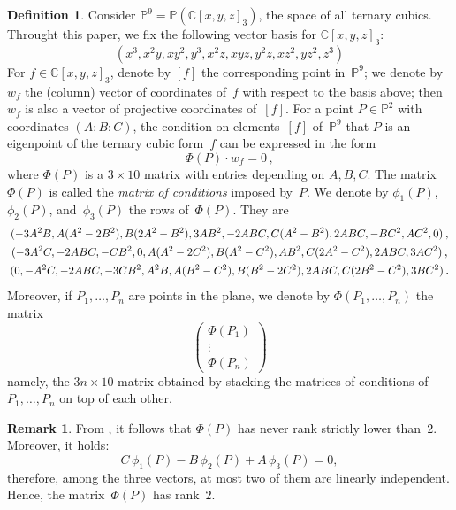 \documentclass[12pt, a4paper, reqno, captions=tableheading,bibliography=totoc]{scrartcl}
\theoremstyle{plain}
\theoremstyle{definition}
\newtheorem{definition}[lemma]{Definition}
\newtheorem{rmk}[lemma]{Remark}
\newcommand{\C}{\mathbb{C}}
\newcommand{\p}{\mathbb{P}}
\newcommand\scalemath[2]{\scalebox{#1}{\mbox{\ensuremath{\displaystyle #2}}}}
\begin{document}
\begin{definition}
\label{definition:matrix_conditions}
 Consider $\p^9 = \p(\C[x,y,z]_3)$, the space of all ternary cubics.
 Throught this paper, we fix the following vector basis for $\C[x,y,z]_3$:
 \[
  (x^3, x^2 y, x y^2, y^3, x^2 z, x y z, y^2 z, x z^2, y z^2, z^3)
 \]
 For $f \in \C[x,y,z]_3$, denote by $[f]$ the corresponding point in~$\p^9$; we denote by $w_f$ the (column) vector of coordinates of~$f$ with respect to the basis above; then $w_f$ is also a vector of projective coordinates of~$[f]$.
 For a point $P \in \p^2$ with coordinates $(A: B: C)$, the condition on elements~$[f]$ of~$\p^9$ that $P$ is an eigenpoint of the ternary cubic form~$f$ can be expressed in the form
 \[
  \Phi(P) \cdot w_f
  = 0 \,,
 \]
 where $\Phi(P)$ is a $3 \times 10$ matrix with entries depending on $A, B, C$.
 The matrix $\Phi(P)$ is called the \emph{matrix of conditions} imposed by~$P$.
We denote by $\phi_1(P)$, $\phi_2(P)$, and~$\phi_3(P)$ the rows of~$\Phi(P)$.
They are
%
\begin{equation}
\label{equation:matrix_conditions_rows}
\begin{gathered}
\scalemath{0.9}{(-3A^2B, A(A^2 - 2B^2), B(2A^2 - B^2), 3AB^2,
 -2ABC, C(A^2 - B^2), 2 ABC,
 -B  C^2, A  C^2, 0)} \,, \\
\scalemath{0.9}{(-3A^2 C,
-2ABC,
-CB^2,
0,
A(A^2-2C^2),
B(A^2 - C^2),
AB^2,
C(2A^2-C^2),
2ABC,
3AC^2)} \,,\\
\scalemath{0.9}{(0,
-A^2C,
-2ABC,
-3CB^2,
A^2 B,
A(B^2 - C^2),
B(B^2-2C^2),
2ABC,
C(2B^2-C^2),
3BC^2)} \,.
\end{gathered}
\end{equation}
%
Moreover, if $P_1, \dotsc, P_n$ are points in the plane, we denote by $\Phi(P_1, \dotsc, P_n)$ the matrix
%
\[
 \left(
 \begin{array}{c}
  \Phi(P_1) \\
  \vdots \\
  \Phi(P_n)
 \end{array}
 \right)
\]
%
namely, the $3n \times 10$ matrix obtained by stacking the matrices of conditions of~$P_1, \dotsc, P_n$ on top of each other.
\end{definition}

\begin{rmk}
From , it follows that $\Phi(P)$ has never rank strictly lower than~$2$.
Moreover, it holds:
\begin{equation}
  C \, \phi_1(P) - B \, \phi_2(P) + A \, \phi_3(P) = 0,
  \label{eq:base}
\end{equation}
therefore,
among the three vectors, at most two of them are linearly independent.
Hence, the matrix~$\Phi(P)$ has rank~$2$.
\end{rmk}
\end{document}
